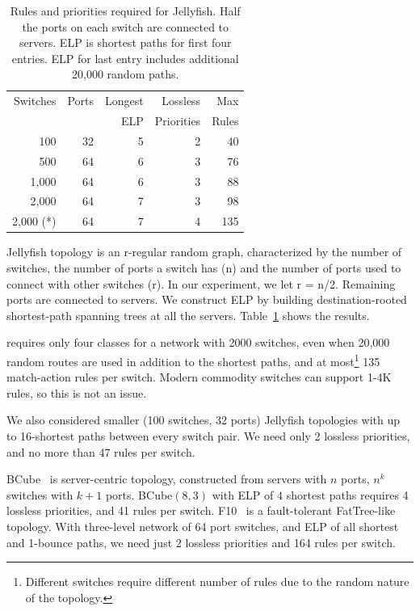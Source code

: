 \begin{table}[t]
	\centering
		\begin{tabular}{|r|r|r|r|r|}
			\hline
				Switches & Ports & Longest & Lossless & Max \\
						 &		 & ELP & Priorities & Rules \\
			\hline
			\hline
			100 & 32 & 5 & 2 &  40 \\
			\hline
			500 & 64 & 6 & 3 & 76 \\
			\hline
			1,000 & 64 & 6 & 3 & 88 \\
			\hline
			2,000 & 64 & 7 & 3 & 98 \\
			\hline
			2,000 (*)  & 64 & 7 & 4 &  135\\
			\hline
			
		\end{tabular}
		\caption{Rules and priorities required for Jellyfish. Half the ports on
		each switch are connected to servers. ELP is shortest paths for first four entries. ELP for last entry includes additional 20,000 random paths.}
		\vspace{-2em}
\label{table:jellyfish_shortestpath} \end{table}




Jellyfish topology is an r-regular random graph, characterized by the number of
switches, the number of ports a switch has (n) and the number of ports used to
connect with other switches (r).  In our experiment, we let r = n/2. Remaining
ports are connected to servers. We construct ELP by building destination-rooted
shortest-path spanning trees at all the servers.
Table~\ref{table:jellyfish_shortestpath} shows the results.

\sysname{} requires only four classes for a network with 2000 switches, even
when 20,000 random routes are used in addition to the shortest paths, and at
most\footnote{Different switches require different number of rules due to the
random nature of the topology.} 135 match-action rules per switch.  Modern
commodity switches can support 1-4K rules, so this is not an issue.

We also considered smaller (100 switches, 32 ports) Jellyfish
topologies with up to 16-shortest paths between every switch pair.
We need only 2 lossless priorities, and no more than 47 rules per switch.

BCube~\cite{bcube} is server-centric topology, constructed from servers with $n$
ports, $n^k$ switches with $k+1$ ports. BCube$(8,3)$ with ELP of $4$ shortest
paths requires 4 lossless priorities, and 41 rules per switch.
F10~\cite{f10} is a fault-tolerant FatTree-like topology.  With three-level
network of 64 port switches, and ELP of all shortest and 1-bounce paths, we need
just 2 lossless priorities and 164 rules per switch.

